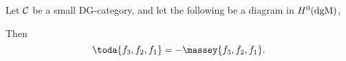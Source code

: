 \begin{lemma}
    Let \( {\mathcal{C}} \) be a small DG-category, and let the following be a diagram in \( H^0(\operatorname{dgM}) \),
    \begin{center}
    \end{center}
    Then
    \[
        \toda{f_3, f_2, f_1} = -\massey{f_3, f_2, f_1}.
    \]
\end{lemma}

